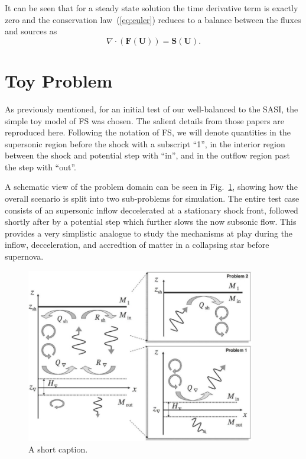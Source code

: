 It can be seen that for a steady state solution the time derivative term is exactly zero and the conservation law~(\ref{eq:euler}) reduces to a balance between the fluxes and sources as
\begin{equation}
\nabla\cdot(\mathbf{F}(\mathbf{U}))=\mathbf{S}(\mathbf{U}).
\end{equation}


\section{Toy Problem}
\label{sec:toyProblem}

As previously mentioned, for an initial test of our well-balanced  to the SASI, the simple toy model of FS was chosen. The salient details from those papers  \cite{Foglizzo2009,Sato2009} are reproduced here. Following the notation of FS, we will denote quantities in the supersonic region before the shock with a subscript ``1'', in the interior region between the shock and potential step with ``in'', and in the outflow region past the step with ``out''.

A schematic view of the problem domain can be seen in Fig.~\ref{fig:Sato1}, showing how the overall scenario is split into two sub-problems for simulation. The entire test case consists of an supersonic inflow deccelerated at a stationary shock front, followed shortly after by a potential step which further slows the now subsonic flow. This provides a very simplistic analogue to study the mechanisms at play during the inflow, decceleration, and accredtion of matter in a collapsing star before supernova.

\begin {figure}
\centering
\includegraphics[width=10cm]{figures/Sato1}
\caption {A short caption.}
\label{fig:Sato1}
\end{figure}

